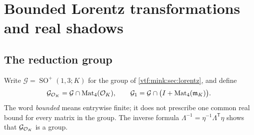 \documentclass[11pt,letterpaper]{article}
\theoremstyle{definition}
\theoremstyle{remark}
\newcommand{\SO}{\operatorname{SO}}\newcommand{\SL}{\operatorname{SL}}
\begin{document}
\section{Bounded Lorentz transformations and real shadows}\label{vtf:mink:sec:bounded}

\subsection{The reduction group}
Write $\mathcal G=\SO^+(1,3;K)$ for the group of \cref{vtf:mink:sec:lorentz}, and define
\begin{equation}
 \mathcal G_{\mathcal O_K}=\mathcal G\cap\operatorname{Mat}_4(\mathcal O_K),\qquad
 \mathcal G_1=\mathcal G\cap\bigl(I+\operatorname{Mat}_4(\mathfrak m_K)\bigr).
\end{equation}
The word \emph{bounded} means entrywise finite; it does not prescribe one common real bound for every matrix in the group. The inverse formula $\Lambda^{-1}=\eta^{-1}\Lambda^{\mathsf T}\eta$ shows that $\mathcal G_{\mathcal O_K}$ is a group.
\end{document}
